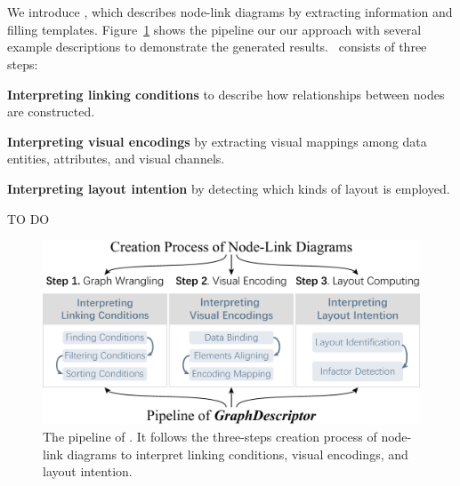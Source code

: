 \section{\ApproachName}
We introduce \ApproachName, which describes node-link diagrams by extracting information and filling templates.
Figure~\ref{fig:workflow} shows the pipeline our our approach with several example descriptions to demonstrate the generated results.
\ApproachName~consists of three steps:
\begin{compactenum}
\item \textbf{Interpreting linking conditions} to describe how relationships between nodes are constructed.
\item \textbf{Interpreting visual encodings} by extracting visual mappings among data entities, attributes, and visual channels.
\item \textbf{Interpreting layout intention} by detecting which kinds of layout is employed.
\end{compactenum}

{\color{red} TO DO}

\begin{figure}
    \centering
    \includegraphics[width=1\columnwidth]{figures/workflow.eps}
    \caption{The pipeline of \textit{\ApproachName}. It follows the three-steps creation process of node-link diagrams to interpret linking conditions, visual encodings, and layout intention.}
    \label{fig:workflow}
\end{figure}


